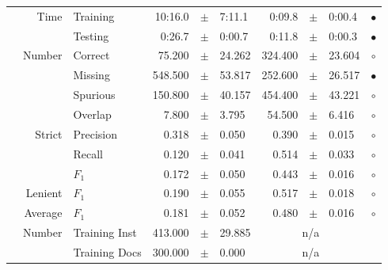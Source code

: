\begin{longtable}{|r|r|l||rcl|rcl|c|}
\cline{2-10} & \multirow{2}{*}{      Time} &        Training &     10:16.0 &  $\pm$  &      7:11.1 &      0:09.8 &  $\pm$  &      0:00.4 & $\bullet$ \\
\cline{3-10} &                             &         Testing &      0:26.7 &  $\pm$  &      0:00.7 &      0:11.8 &  $\pm$  &      0:00.3 & $\bullet$ \\
\hline
\pagebreak
\hline
\hline
\multirow{11}{*}{\begin{sideways}purchabr\end{sideways} }
             & \multirow{4}{*}{    Number} &         Correct &      75.200 &  $\pm$  &      24.262 &     324.400 &  $\pm$  &      23.604 & $\circ$ \\
\cline{3-10} &                             &         Missing &     548.500 &  $\pm$  &      53.817 &     252.600 &  $\pm$  &      26.517 & $\bullet$ \\
\cline{3-10} &                             &        Spurious &     150.800 &  $\pm$  &      40.157 &     454.400 &  $\pm$  &      43.221 & $\circ$ \\
\cline{3-10} &                             &         Overlap &       7.800 &  $\pm$  &       3.795 &      54.500 &  $\pm$  &       6.416 & $\circ$ \\
\cline{2-10} & \multirow{3}{*}{    Strict} &       Precision &       0.318 &  $\pm$  &       0.050 &       0.390 &  $\pm$  &       0.015 & $\circ$ \\
\cline{3-10} &                             &          Recall &       0.120 &  $\pm$  &       0.041 &       0.514 &  $\pm$  &       0.033 & $\circ$ \\
\cline{3-10} &                             &           $F_1$ &       0.172 &  $\pm$  &       0.050 &       0.443 &  $\pm$  &       0.016 & $\circ$ \\
\cline{2-10} &                     Lenient &           $F_1$ &       0.190 &  $\pm$  &       0.055 &       0.517 &  $\pm$  &       0.018 & $\circ$ \\
\cline{2-10} &                     Average &           $F_1$ &       0.181 &  $\pm$  &       0.052 &       0.480 &  $\pm$  &       0.016 & $\circ$ \\
\cline{2-10} & \multirow{2}{*}{    Number} &   Training Inst &     413.000 &  $\pm$  &      29.885 &    \multicolumn{3}{c|}{n/a}         &  \\
\cline{3-10} &                             &   Training Docs &     300.000 &  $\pm$  &       0.000 &    \multicolumn{3}{c|}{n/a}         &  \\

\end{longtable}
